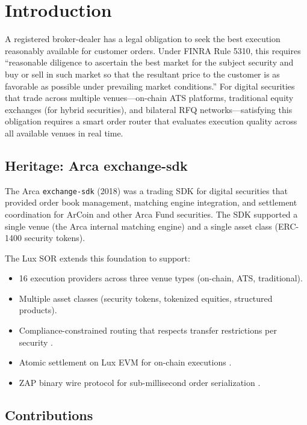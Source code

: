 \section{Introduction}


A registered broker-dealer has a legal obligation to seek the best execution reasonably available for customer orders. Under FINRA Rule 5310, this requires ``reasonable diligence to ascertain the best market for the subject security and buy or sell in such market so that the resultant price to the customer is as favorable as possible under prevailing market conditions.'' For digital securities that trade across multiple venues---on-chain ATS platforms, traditional equity exchanges (for hybrid securities), and bilateral RFQ networks---satisfying this obligation requires a smart order router that evaluates execution quality across all available venues in real time.

\subsection{Heritage: Arca exchange-sdk}

The Arca \texttt{exchange-sdk} (2018) was a trading SDK for digital securities that provided order book management, matching engine integration, and settlement coordination for ArCoin and other Arca Fund securities. The SDK supported a single venue (the Arca internal matching engine) and a single asset class (ERC-1400 security tokens).

The Lux SOR extends this foundation to support:

\begin{itemize}[nosep]
  \item 16 execution providers across three venue types (on-chain, ATS, traditional).
  \item Multiple asset classes (security tokens, tokenized equities, structured products).
  \item Compliance-constrained routing that respects transfer restrictions per security \cite{lux-security-token-standard}.
  \item Atomic settlement on Lux EVM for on-chain executions \cite{lux-ats-architecture}.
  \item ZAP binary wire protocol for sub-millisecond order serialization \cite{lux-zap-wire-protocol}.
\end{itemize}

\subsection{Contributions}

